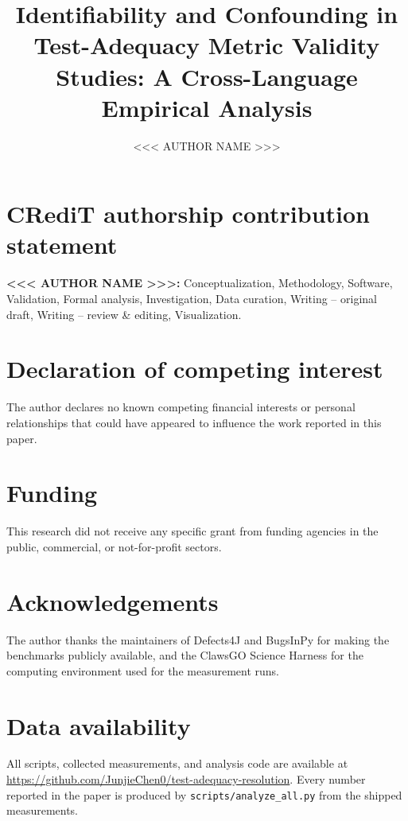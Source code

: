 \documentclass[preprint,12pt]{elsarticle}
\begin{document}
\begin{frontmatter}

\title{Identifiability and Confounding in Test-Adequacy Metric Validity
Studies: A Cross-Language Empirical Analysis}

\author[a]{<<< AUTHOR NAME >>>}


\end{frontmatter}

\section*{CRediT authorship contribution statement}

\textbf{<<< AUTHOR NAME >>>:} Conceptualization, Methodology, Software,
Validation, Formal analysis, Investigation, Data curation, Writing -- original
draft, Writing -- review \& editing, Visualization.

\section*{Declaration of competing interest}

The author declares no known competing financial interests or personal
relationships that could have appeared to influence the work reported in this
paper.

\section*{Funding}

This research did not receive any specific grant from funding agencies in the
public, commercial, or not-for-profit sectors.

\section*{Acknowledgements}

The author thanks the maintainers of Defects4J and BugsInPy for making the
benchmarks publicly available, and the ClawsGO Science Harness for the
computing environment used for the measurement runs.

\section*{Data availability}

All scripts, collected measurements, and analysis code are available at
\url{https://github.com/JunjieChen0/test-adequacy-resolution}. Every number
reported in the paper is produced by \texttt{scripts/analyze\_all.py} from the
shipped measurements.
\end{document}
